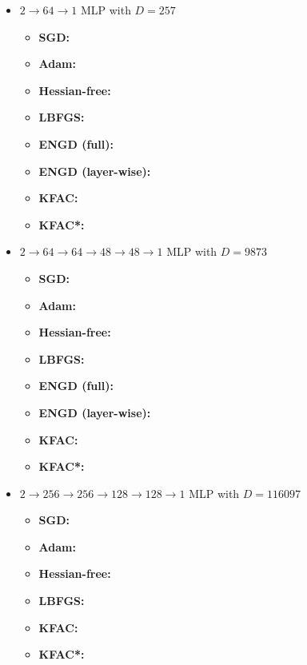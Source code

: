 \begin{itemize}
\item $2\to 64\to 1$ MLP with $D=257$
  \begin{itemize}
    \def\pathToRuns{kfac_pinns_exp/exp13_reproduce_heat1d/tex}
  \item \textbf{SGD:} 
  \item \textbf{Adam:} 
  \item \textbf{Hessian-free:} 
  \item \textbf{LBFGS:} 
  \item \textbf{ENGD (full):} 
  \item \textbf{ENGD (layer-wise):} 
  \item \textbf{KFAC:} 
  \item \textbf{KFAC*:} 
  \end{itemize}

\item $2 \to 64 \to 64 \to 48 \to 48 \to 1$ MLP with $D=\num{9873}$
  \begin{itemize}
    \def\pathToRuns{kfac_pinns_exp/exp22_heat1d_mlp_tanh_64/tex}
  \item \textbf{SGD:} 
  \item \textbf{Adam:} 
  \item \textbf{Hessian-free:} 
  \item \textbf{LBFGS:} 
  \item \textbf{ENGD (full):} 
  \item \textbf{ENGD (layer-wise):} 
  \item \textbf{KFAC:} 
  \item \textbf{KFAC*:} 
  \end{itemize}

\item $2 \to 256 \to 256\to 128 \to 128 \to 1$ MLP with $D=\num{116097}$
  \begin{itemize}
    \def\pathToRuns{kfac_pinns_exp/exp23_heat1d_mlp_tanh_256/tex}
  \item \textbf{SGD:} 
  \item \textbf{Adam:} 
  \item \textbf{Hessian-free:} 
  \item \textbf{LBFGS:} 
  \item \textbf{KFAC:} 
  \item \textbf{KFAC*:} 
  \end{itemize}
\end{itemize}

